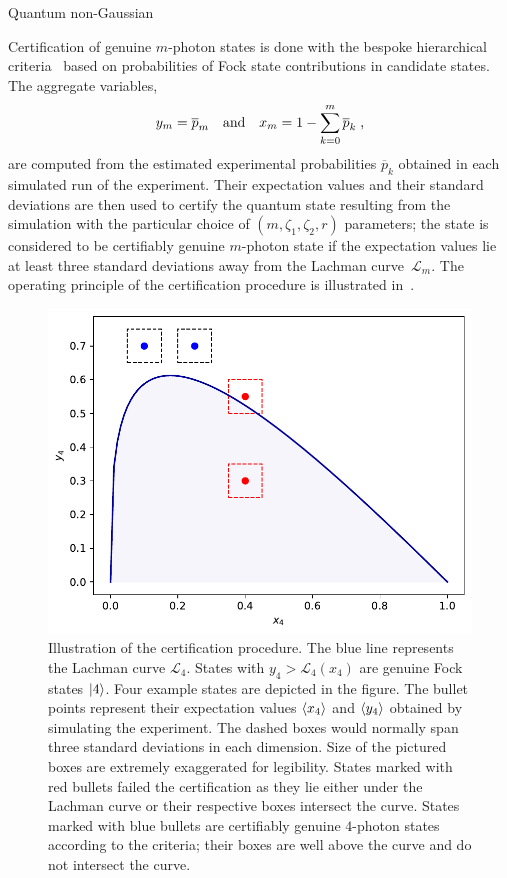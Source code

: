 \documentclass{article}
\begin{document}
Quantum non-Gaussian 


Certification of genuine $m$-photon states is done with the bespoke hierarchical criteria~\cite{lachman2019} based on probabilities of Fock state contributions in candidate states. The aggregate variables,
%
\begin{equation}
  y_{m} = \overline{p}_{m} 
  \quad\text{and}\quad
  x_{m} = 1 - \sum_{k = 0}^{m} \overline{p}_{k} 
  \;\text{,}
\end{equation}
%
are computed from the estimated experimental probabilities $\overline{p}_{k}$ obtained in each simulated run of the experiment. Their expectation values and their standard deviations are then used to certify the quantum state resulting from the simulation with the particular choice of $(m, \zeta_{1}, \zeta_{2}, r)$ parameters; the state is considered to be certifiably genuine $m$-photon state if the expectation values lie at least three standard deviations away from the Lachman curve~$\mathcal{L}_{m}$. The operating principle of the certification procedure is illustrated in~.

\begin{figure}[h]
  \begin{center}
    \includegraphics[width = 0.50 \columnwidth]{import/illustrate_lachman_curve.pdf}
  \end{center}
  \caption{
    Illustration of the certification procedure. The blue line represents the Lachman curve $\mathcal{L}_{4}$. States with $y_{4} > \mathcal{L}_{4}(x_{4})$ are genuine Fock states $\ket{4}$. Four example states are depicted in the figure. The bullet points represent their expectation values $\langle x_{4} \rangle$ and $\langle y_{4} \rangle$ obtained by simulating the experiment. The dashed boxes would normally span three standard deviations in each dimension. Size of the pictured boxes are extremely exaggerated for legibility. States marked with red bullets failed the certification as they lie either under the Lachman curve or their respective boxes intersect the curve. States marked with blue bullets are certifiably genuine $4$-photon states according to the criteria; their boxes are well above the curve and do not intersect the curve.
  }
  \label{f-otm-il}
\end{figure}
\end{document}
